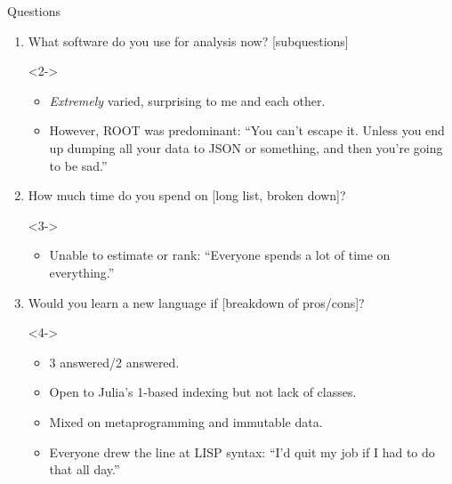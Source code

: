 \documentclass{beamer}
\begin{document}
\begin{frame}{Questions}
\vspace{0.5 cm}
\begin{enumerate}
\item What software do you use for analysis now? [subquestions]

\begin{uncoverenv}<2->
\begin{itemize}
\item {\it Extremely} varied, surprising to me and each other.
\item However, ROOT was predominant: \textcolor{aug29}{``You can't escape it. Unless you end up dumping all your data to JSON or something, and then you're going to be sad.''}
\end{itemize}
\end{uncoverenv}

\item How much time do you spend on [long list, broken down]?

\begin{uncoverenv}<3->
\begin{itemize}
\item Unable to estimate or rank: \textcolor{aug29}{``Everyone spends a lot of time on everything.''}
\end{itemize}
\end{uncoverenv}

\item Would you learn a new language if [breakdown of pros/cons]?

\begin{uncoverenv}<4->
\begin{itemize}
\item \textcolor{aug29}{3 answered}/\textcolor{aug31}{2 answered}.
\item Open to Julia's 1-based indexing but not lack of classes.
\item Mixed on metaprogramming and immutable data.
\item Everyone drew the line at LISP syntax: \textcolor{aug31}{``I'd quit my job if I had to do that all day.''}
\end{itemize}
\end{uncoverenv}
\end{enumerate}
\end{frame}
\end{document}

